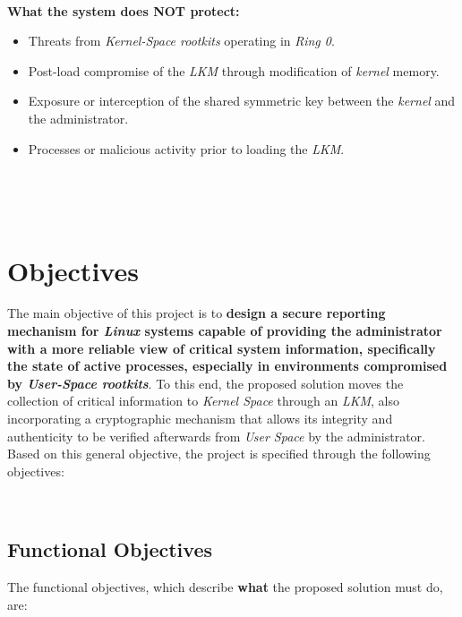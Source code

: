 \

\textbf{What the system does NOT protect:}

\begin{itemize}
    \item Threats from \textit{Kernel-Space rootkits} operating in \textit{Ring 0}.
    \item Post-load compromise of the \textit{LKM} through modification of \textit{kernel} memory.
    \item Exposure or interception of the shared symmetric key between the \textit{kernel} and the administrator.
    \item Processes or malicious activity prior to loading the \textit{LKM}.
  \end{itemize}

\

\

\section{Objectives}

The main objective of this project is to \textbf{design a secure reporting mechanism for \textit{Linux} systems capable of providing the administrator with a more reliable view of critical system information, specifically the state of active processes, especially in environments compromised by \textit{User-Space rootkits}}.
To this end, the proposed solution moves the collection of critical information to \textit{Kernel Space} through an \textit{LKM}, also incorporating a cryptographic mechanism that allows its integrity and authenticity to be verified afterwards from \textit{User Space} by the administrator.\\

Based on this general objective, the project is specified through the following objectives:

\

\subsection{Functional Objectives}
\label{sec:ofunc}

The functional objectives, which describe \textbf{what} the proposed solution must do, are:

